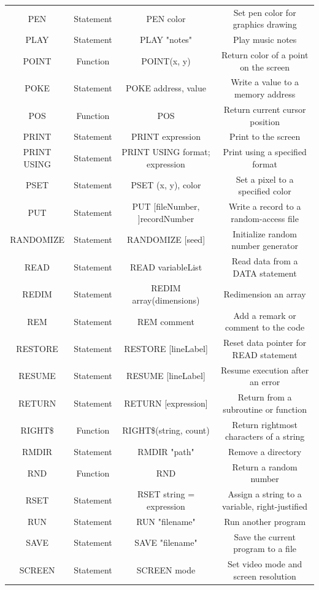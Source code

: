 \documentclass[10pt, reqno]{exam}
\begin{document}
{\begin{longtable}{|c|c|c|c|}
    PEN & Statement & PEN color & Set pen color for graphics drawing \\
    PLAY & Statement & PLAY "notes" & Play music notes \\
    POINT & Function & POINT(x, y) & Return color of a point on the screen \\
    POKE & Statement & POKE address, value & Write a value to a memory address \\
    POS & Function & POS & Return current cursor position \\
    PRINT & Statement & PRINT expression & Print to the screen \\
    PRINT USING & Statement & PRINT USING format; expression & Print using a specified format \\
    PSET & Statement & PSET (x, y), color & Set a pixel to a specified color \\
    PUT & Statement & PUT [fileNumber, ]recordNumber & Write a record to a random-access file \\
    RANDOMIZE & Statement & RANDOMIZE [seed] & Initialize random number generator \\
    READ & Statement & READ variableList & Read data from a DATA statement \\
    REDIM & Statement & REDIM array(dimensions) & Redimension an array \\
    REM & Statement & REM comment & Add a remark or comment to the code \\
    RESTORE & Statement & RESTORE [lineLabel] & Reset data pointer for READ statement \\
    RESUME & Statement & RESUME [lineLabel] & Resume execution after an error \\
    RETURN & Statement & RETURN [expression] & Return from a subroutine or function \\
    RIGHT\$ & Function & RIGHT\$(string, count) & Return rightmost characters of a string \\
    RMDIR & Statement & RMDIR "path" & Remove a directory \\
    RND & Function & RND & Return a random number \\
    RSET & Statement & RSET string = expression & Assign a string to a variable, right-justified \\
    RUN & Statement & RUN "filename" & Run another program \\
    SAVE & Statement & SAVE "filename" & Save the current program to a file \\
    SCREEN & Statement & SCREEN mode & Set video mode and screen resolution \\

\end{longtable}}
\end{document}
